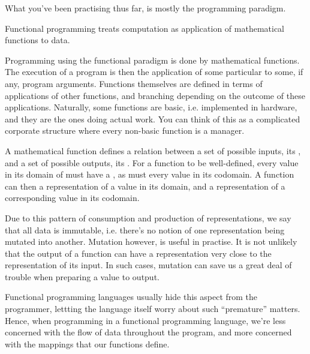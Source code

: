 
What you've been practising thus far, is mostly the 
programming paradigm.

\begin{definition}

Functional programming treats computation as application of mathematical
functions to  data.

\end{definition}

Programming using the functional paradigm is done by 
mathematical functions. The execution of a program is then the application of
some particular  to some, if any, program arguments.
Functions themselves are defined in terms of applications of other functions,
and branching depending on the outcome of these applications.  Naturally, some
functions are basic, i.e. implemented in hardware, and they are the ones doing
actual work. You can think of this as a complicated corporate structure where
every non-basic function is a manager.

A mathematical function defines a relation between a set of possible inputs,
its , and a set of possible outputs, its . For a
function to be well-defined, every value in its domain of must have a
, as must every value in its codomain.
A function can then  a representation of a value in its domain,
and  a representation of a corresponding value in its codomain.


Due to this pattern of consumption and production of representations, we say
that all data is immutable, i.e. there's no notion of one representation being
mutated into another. Mutation however, is useful in practise. It is not
unlikely that the output of a function can have a representation very close to
the representation of its input. In such cases, mutation can save us a great
deal of trouble when preparing a value to output.

Functional programming languages usually hide this aspect from the programmer,
lettting the language itself worry about such ``premature'' matters. Hence,
when programming in a functional programming language, we're less concerned
with the flow of data throughout the program, and more concerned with the
mappings that our functions define.
